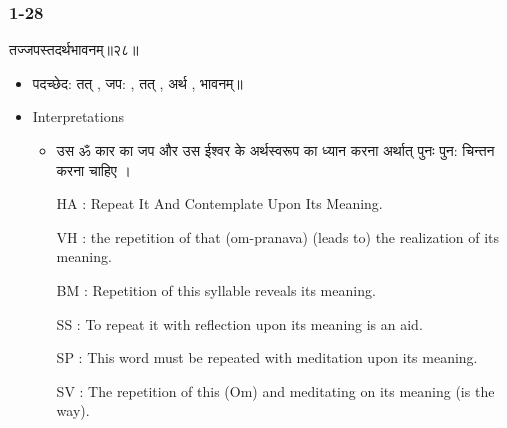 \begin{frame}[fragile]\frametitle{1-28}
\begin{sanskrit}
तज्जपस्तदर्थभावनम्॥२८॥
\end{sanskrit}

	\begin{itemize}
	\item पदच्छेद: तत् , जप: , तत् , अर्थ , भावनम्॥
	\item Interpretations
		\begin{itemize}	
		\item उस ॐ कार का जप और उस ईश्वर के अर्थस्वरूप का ध्यान करना अर्थात् पुनः पुन: चिन्तन करना चाहिए ।
		\item [HA]: Repeat It And Contemplate Upon Its Meaning.
		\item [VH]: the repetition of that (om-pranava) (leads to) the realization of its meaning.
		\item [BM]: Repetition of this syllable reveals its meaning.
		\item [SS]: To repeat it with reflection upon its meaning is an aid.
		\item [SP]: This word must be repeated with meditation upon its meaning.
		\item [SV]: The repetition of this (Om) and meditating on its meaning (is the way). 
		\end{itemize}
	\end{itemize}
	
\end{frame}


